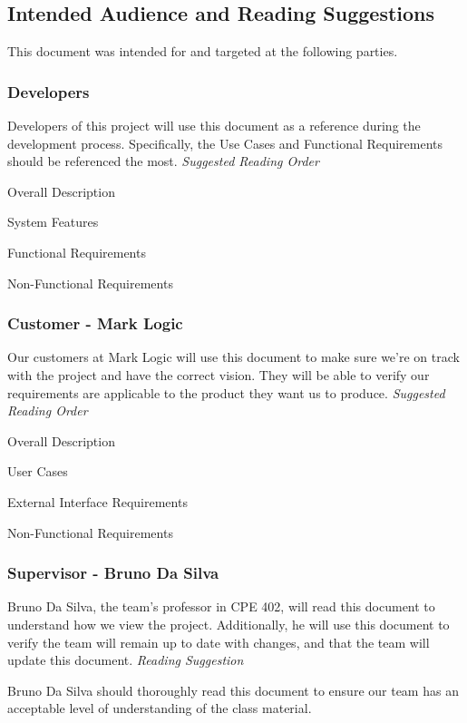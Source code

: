 \documentclass[12pt,oneside,letterpaper]{article}
\newenvironment{packed_enumerate}{ %
\vspace{-7mm}
\begin{enumerate}
  \setlength{\itemsep}{0pt}
  \setlength{\parskip}{0pt}
  \setlength{\parsep}{0pt}
}{\end{enumerate}
\vspace{-8mm}}
\begin{document}
\subsection{Intended Audience and Reading Suggestions}
This document was intended for and targeted at the following parties.
\subsubsection{Developers}
Developers of this project will use this document as a reference during the development process. Specifically, the Use Cases and Functional Requirements should be referenced the most.\newline
\textit{Suggested Reading Order}\newline
\begin{packed_enumerate}
\item Overall Description
\item System Features
\item Functional Requirements
\item Non-Functional Requirements\newline
\end{packed_enumerate}

\subsubsection{Customer - Mark Logic}
Our customers at Mark Logic will use this document to make sure we're on track with the project and have the correct vision. They will be able to verify our requirements are applicable to the product they want us to produce.\newline
\textit{Suggested Reading Order}\newline
\begin{packed_enumerate}
\item Overall Description
\item User Cases
\item External Interface Requirements
\item Non-Functional Requirements\newline
\end{packed_enumerate}

\subsubsection{Supervisor - Bruno Da Silva}
Bruno Da Silva, the team's professor in CPE 402, will read this document to understand how we view the project. Additionally, he will use this document to verify the team will remain up to date with changes, and that the team will update this document.\newline
\textit{Reading Suggestion}\newline
\par Bruno Da Silva should thoroughly read this document to ensure our team has an acceptable level of understanding of the class material.
\end{document}
